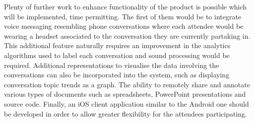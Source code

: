 \documentclass[12p, a4paper, onecolumn]{report}
\begin{document}
\begin{appendices}
Plenty of further work to enhance functionality of the product is possible which will be implemented, time permitting. The first of them would be to integrate voice messaging resembling phone conversations where each attendee would be wearing a headset associated to the conversation they are currently partaking in. This additional feature naturally requires an improvement in the analytics algorithms used to label each conversation and sound processing would be required. Additional representations to visualise the data involving the conversations can also be incorporated into the system, such as displaying conversation topic trends as a graph. The ability to remotely share and annotate various types of documents such as spreadsheets, PowerPoint presentations and source code. Finally, an iOS client application similar to the Android one should be developed in order to allow greater flexibility for the attendees participating. 

\end{appendices}
\end{document}

